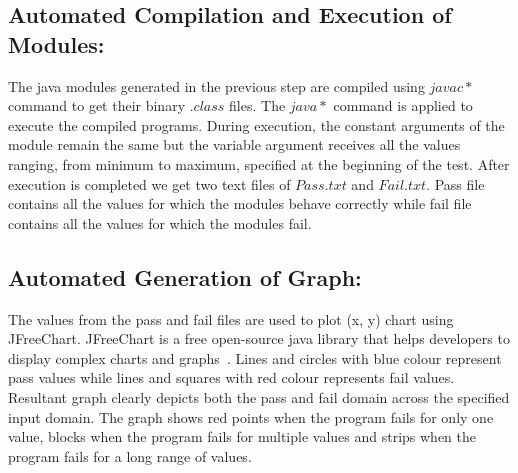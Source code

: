 \subsection{Automated Compilation and Execution of Modules:}
The java modules generated in the previous step are compiled using $javac *$ command to get their binary $.class$ files. The $java *$ command is applied to execute the compiled programs. During execution, the constant arguments of the module remain the same but the variable argument receives all the values ranging, from minimum to maximum, specified at the beginning of the test. After execution is completed we get two text files of $Pass.txt$ and $Fail.txt$. Pass file contains all the values for which the modules behave correctly while fail file contains all the values for which the modules fail.

\subsection{Automated Generation of Graph:}
The values from the pass and fail files are used to plot (x, y) chart using JFreeChart. JFreeChart is a free open-source java library that helps developers to display complex charts and graphs~\cite{gilbert2008jfreechart}. Lines and circles with blue colour represent pass values while lines and squares with red colour represents fail values. Resultant graph clearly depicts both the pass and fail domain across the specified input domain. The graph shows red points when the program fails for only one value, blocks when the program fails for multiple values and strips when the program fails for a long range of values.%








